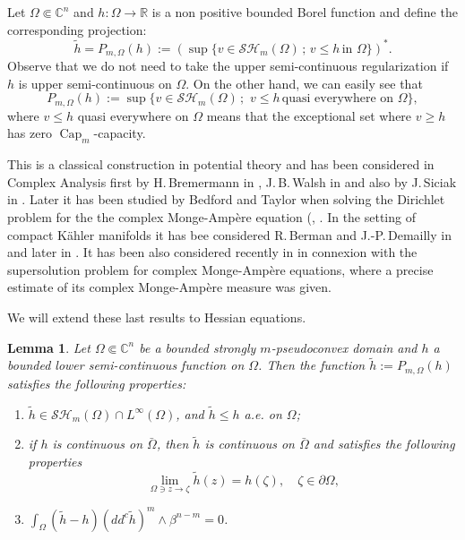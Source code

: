 \documentclass[JEP,XML,SOM,Unicode]{cedram}
\newenvironment{enumeratei}
{\bgroup\def\theenumi{\roman{enumi}}\def\theenumii{\arabic{enumii}}\begin{enumerate}}
{\end{enumerate}\egroup}
\newcommand{\sep}{\,;\,}
\newtheorem{lemma}[theorem]{Lemma}
\theoremstyle{definition}
\newcommand{\R}{\mathbb{R}}
\renewcommand{\C}{\mathbb{C}}
\DeclareMathOperator{\Capa}{Cap}
\begin{document}
Let $\Omega \Subset \C^n$ and $h: \Omega \to \R$ is a non positive bounded Borel function and define the corresponding projection:
\begin{equation} \label{eq:subextension}
\tilde h = P_{m,\Omega} (h):= \left(\sup \{v \in \mathcal {SH}_m (\Omega) \sep v \leq h \, \text{in} \, \, \Omega\}\right)^*.
\end{equation}
Observe that we do not need to take the upper semi-continuous regularization if $h$ is upper semi-continuous on $\Omega$. On the other hand, we can easily see that
\[
P_{m,\Omega} (h):= \sup \{v \in \mathcal {SH}_m (\Omega) \sep \, v \leq h \, \text{quasi everywhere on} \, \, \Omega\},
\]
where $v \leq h$ quasi everywhere on $\Omega$ means that the exceptional set where $v \geq h$ has zero $\Capa_m$-capacity.

This is a classical construction in potential theory and has been considered in Complex Analysis first by H.\,Bremermann in \cite{Brem59}, J.\,B.\,Walsh in \cite{Wal69} and also by J.\,Siciak in \cite{Sic81}. Later it has been studied by Bedford and Taylor when solving the Dirichlet problem for the the complex Monge-Ampère equation (\cite{BT76}, \cite{BT82}. In the setting of compact Kähler manifolds it has bee considered R.\,Berman and J.-P.\,Demailly in \cite{BD12} and later in \cite{Ber19}. It has been also considered recently in \cite{GLZ19} in connexion with the supersolution problem for complex Monge-Ampère equations, where a precise estimate of its complex Monge-Ampère measure was given.

We will extend these last results to Hessian equations.

\begin{lemma} \label{lem:projection} Let $\Omega \Subset \C^n$ be a bounded strongly $m$-pseudoconvex domain and $h$ a bounded lower semi-continuous function on $\Omega$. Then the function $\tilde h:= P_{m,\Omega} (h)$ satisfies the following properties:
\begin{enumeratei}
\item\label{lem:projectioni}
$\tilde h \in \mathcal {SH}_m (\Omega) \cap L^{\infty} (\Omega)$, and $\tilde h \leq h$ a.e. on $\Omega$;

\item\label{lem:projectionii}
if $h$ is continuous on $\bar \Omega$, then $\tilde h$ is continuous on $\bar{\Omega}$ and satisfies the following properties
\begin{equation} \label{eq:boundaryvaluesh}
\lim_{\Omega \ni z \to \zeta} \tilde h (z) = h (\zeta), \quad \zeta \in \partial \Omega,
\end{equation}

\item\label{lem:projectioniii}
$ \int_\Omega (\tilde h - h) (dd^c \tilde h)^m \wedge \beta^{n - m} = 0$.
\end{enumeratei}
\end{lemma}
\end{document}
